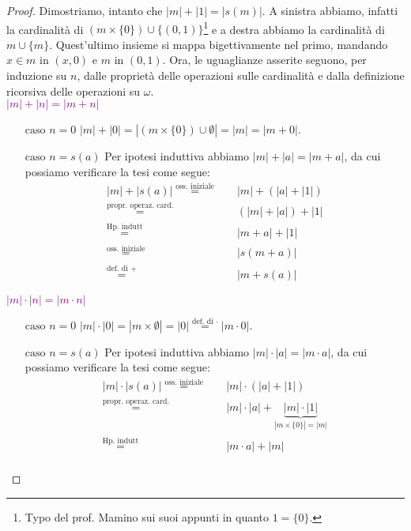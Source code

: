 \documentclass[11pt]{scrartcl}
\begin{document}
\begin{proof}
	Dimostriamo, intanto che $|m| + |1| = |s(m)|$. A sinistra abbiamo, infatti la cardinalità di $(m \times \{0\}) \cup \{(0,1)\}$\footnote{Typo del prof. Mamino sui suoi appunti in quanto $1 = \{0\}$.} e a destra abbiamo la cardinalità di $m \cup \{m\}$.
	Quest'ultimo insieme si mappa bigettivamente nel primo, mandando $x \in m$ in $(x,0)$ e $m$ in $(0,1)$. 
	Ora, le uguaglianze asserite seguono, per induzione su $n$, dalle proprietà delle operazioni sulle cardinalità e dalla definizione ricorsiva delle operazioni su $\omega$.\\
	\textcolor{purple}{$|m|+|n| = |m+n|$}
	\begin{itemize}
		\item[$\boxed{\text{caso $n = 0$}}$] $|m| + |0| =  |(m \times \{0\}) \cup \emptyset| = |m| = |m + 0|$.
		\item[$\boxed{\text{caso $n = s(a)$}}$] Per ipotesi induttiva abbiamo $|m| + |a| = |m + a|$, da cui possiamo verificare la tesi come segue:
		\[ \begin{split}
			|m| + |s(a)| \overset{\text{oss. iniziale}}{=}\quad& |m| + (|a| + |1|) \\
						 \overset{\text{propr. operaz. card.}}{=}& (|m| + |a|) + |1| \\
						 \overset{\text{Hp. indutt}}{=}\quad& |m+a| + |1| \\
						 \overset{\text{oss. iniziale}}{=}\quad& |s(m+a)| \\
						 \overset{\text{def. di $+$}}{=}\quad\;& |m + s(a)|
 		\end{split} 
			\]
	\end{itemize}
	\textcolor{purple}{$|m|\cdot|n| = |m \cdot n|$}
	\begin{itemize}
		\item[$\boxed{\text{caso $n = 0$}}$] $|m| \cdot |0| =  |m \times \emptyset| = |0| \overset{\text{def. di $\cdot$}}{=} |m \cdot 0|$.
		\item[$\boxed{\text{caso $n = s(a)$}}$] Per ipotesi induttiva abbiamo $|m|\cdot|a| = |m \cdot a|$, da cui possiamo verificare la tesi come segue:
		\[ \begin{split}
			|m| \cdot |s(a)| \overset{\text{oss. iniziale}}{=}\quad& |m| \cdot (|a| + |1|) \\
						 \overset{\text{propr. operaz. card.}}{=}& |m| \cdot |a| + \underbrace{|m| \cdot |1|}_{|m \times \{0\}| = |m|} \\
						 \overset{\text{Hp. indutt}}{=}\quad& |m \cdot a| + |m| \\

\end{split}\]
\end{itemize}
\end{proof}
\end{document}
